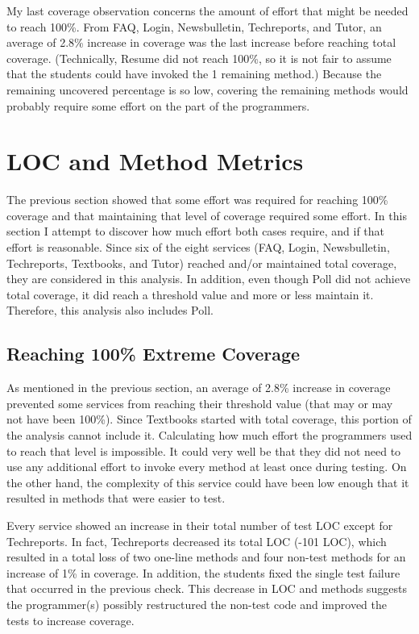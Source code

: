 My last coverage observation concerns the amount of effort that might be
needed to reach 100\%.  From FAQ, Login, Newsbulletin, Techreports, and
Tutor, an average of 2.8\% increase in coverage was the last increase
before reaching total coverage.  (Technically, Resume did not reach 100\%,
so it is not fair to assume that the students could have invoked the 1
remaining method.)  Because the remaining uncovered percentage is so low,
covering the remaining methods would probably require some effort on the
part of the programmers.

\section{LOC and Method Metrics} \label{section.loc.method.metrics}
The previous section showed that some effort was required for reaching
100\% coverage and that maintaining that level of coverage required some
effort.  In this section I attempt to discover how much effort both cases
require, and if that effort is reasonable.  Since six of the eight services
(FAQ, Login, Newsbulletin, Techreports, Textbooks, and Tutor) reached
and/or maintained total coverage, they are considered in this analysis.  In
addition, even though Poll did not achieve total coverage, it did reach a
threshold value and more or less maintain it.  Therefore, this analysis
also includes Poll.

\subsection{Reaching 100\% Extreme Coverage}
As mentioned in the previous section, an average of 2.8\% increase in
coverage prevented some services from reaching their threshold value (that
may or may not have been 100\%).  Since Textbooks started with total
coverage, this portion of the analysis cannot include it.  Calculating how
much effort the programmers used to reach that level is impossible.  It
could very well be that they did not need to use any additional effort to
invoke every method at least once during testing.  On the other hand, the
complexity of this service could have been low enough that it resulted in
methods that were easier to test.

Every service showed an increase in their total number of test LOC except
for Techreports.  In fact, Techreports decreased its total LOC (-101 LOC),
which resulted in a total loss of two one-line methods and four non-test
methods for an increase of 1\% in coverage.  In addition, the students
fixed the single test failure that occurred in the previous check.  This
decrease in LOC and methods suggests the programmer(s) possibly
restructured the non-test code and improved the tests to increase coverage.

